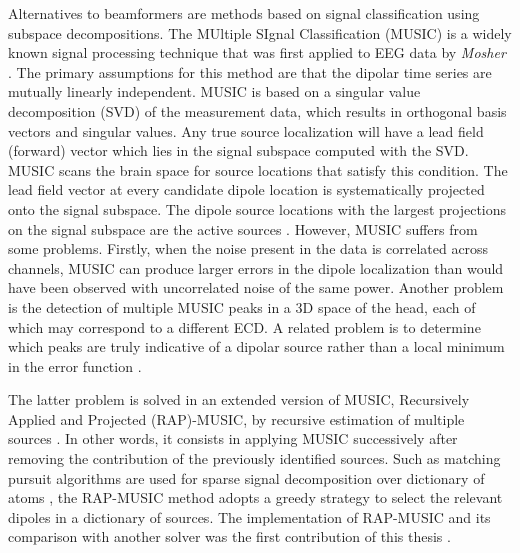 Alternatives to beamformers are methods based on signal classification using subspace decompositions. The MUltiple SIgnal Classification (MUSIC) is a widely known signal processing technique that was first applied to EEG data by \textit{Mosher} \cite{mosher1992multiple}. The primary assumptions for this method are that the dipolar time series are mutually linearly independent. 
MUSIC is based on a singular value decomposition (SVD) of the measurement data, which results in orthogonal basis vectors and singular values. Any true source localization will have a lead field (forward) vector which lies in the signal subspace computed with the SVD. MUSIC scans the brain space for source locations that satisfy this condition. The lead field vector at every candidate dipole location is systematically projected onto the signal subspace. The dipole source locations with the largest projections on the signal subspace are the active sources \cite{mosher1992multiple,mosher1999source}. However, MUSIC suffers from some problems. Firstly, when the noise present in the data is correlated across channels, MUSIC can produce larger errors in the dipole localization than would have been observed with uncorrelated noise of the same power. Another problem is the detection of multiple MUSIC peaks in a 3D space of the head, each of which may correspond to a different ECD. A related problem is to determine which peaks are truly indicative of a dipolar source rather than a local minimum in the error function \cite{mosher1999source}.

The latter problem is solved in an extended version of MUSIC, Recursively Applied and Projected (RAP)-MUSIC, by recursive estimation of multiple sources \cite{mosher1997source,mosher1999source}. In other words, it consists in applying MUSIC successively after removing the contribution of the previously identified sources. Such as matching pursuit algorithms are used for sparse signal decomposition over dictionary of atoms \cite{mallat1993matching}, the RAP-MUSIC method adopts a greedy strategy to select the relevant dipoles in a dictionary of sources. The implementation of RAP-MUSIC and its comparison with another solver was the first contribution of this thesis \cite{strohmeier-etal:16}.

